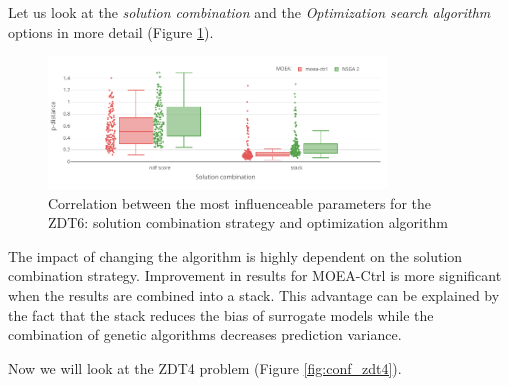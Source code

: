     Let us look at the \emph{solution combination} and the \emph{Optimization search algorithm} options in more detail (Figure \ref{fig:conf_zdt6_sign}). 
    
            \begin{figure}[h!]
                \centering
                \includegraphics[width=0.8\textwidth]{content/images/conf_zdt6_solver}
                \caption[Correlation between the most influenceable parameters for the ZDT6]{Correlation between the most influenceable parameters for the ZDT6: solution combination strategy and optimization algorithm}
                \label{fig:conf_zdt6_sign}    
            \end{figure}
    
    The impact of changing the algorithm is highly dependent on the solution combination strategy. Improvement in results for MOEA-Ctrl is more significant when the results are combined into a stack. This advantage can be explained by the fact that the stack reduces the bias of surrogate models while the combination of genetic algorithms decreases prediction variance.



    Now we will look at the ZDT4 problem (Figure \ref{fig:conf_zdt4}). 
    
